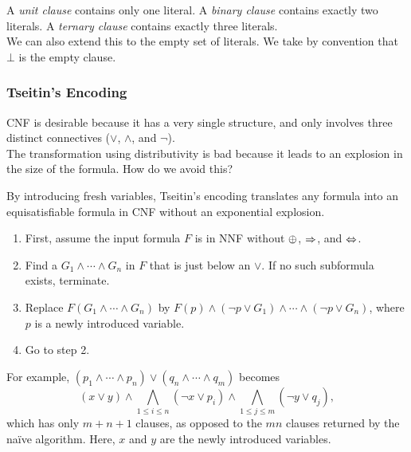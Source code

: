
A \textit{unit clause} contains only one literal. A \textit{binary clause} contains exactly two literals. A \textit{ternary clause} contains exactly three literals.\\
We can also extend this to the empty set of literals. We take by convention that $\bot$ is the empty clause.

\subsubsection{Tseitin's Encoding}

CNF is desirable because it has a very single structure, and only involves three distinct connectives ($\lor$, $\land$, and $\neg$).\\ The transformation using distributivity is bad because it leads to an explosion in the size of the formula. How do we avoid this?

By introducing fresh variables, Tseitin's encoding translates any formula into an equisatisfiable formula in CNF without an exponential explosion.

\begin{enumerate}
	\item First, assume the input formula $F$ is in NNF without $\oplus$, $\Rightarrow$, and $\Leftrightarrow$.
	\item Find a $G_1\land\cdots\land G_n$ in $F$ that is just below an $\lor$. If no such subformula exists, terminate.
	\item Replace $F(G_1\land\cdots\land G_n)$ by $F(p)\land(\neg p\lor G_1)\land\cdots\land(\neg p\lor G_n)$, where $p$ is a newly introduced variable.
	\item Go to step 2.
\end{enumerate}

For example, $(p_1\land\cdots\land p_n)\lor(q_n\land\cdots\land q_m)$ becomes
\[ (x\lor y) \land \bigwedge_{1\leq i\leq n} (\neg x\lor p_i) \land \bigwedge_{1\leq j\leq m} (\neg y \lor q_j), \]
which has only $m+n+1$ clauses, as opposed to the $mn$ clauses returned by the na\"{i}ve algorithm. Here, $x$ and $y$ are the newly introduced variables.\\

